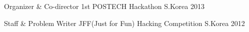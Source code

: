 
\begin{cvhonors}

  \cvhonor
  {Organizer \& Co-director} %
  {1st POSTECH Hackathon} %
  {S.Korea} %
  {2013} %

  \cvhonor
  {Staff \& Problem Writer} %
  {JFF(Just for Fun) Hacking Competition} %
  {S.Korea} %
  {2012} %

\end{cvhonors}

